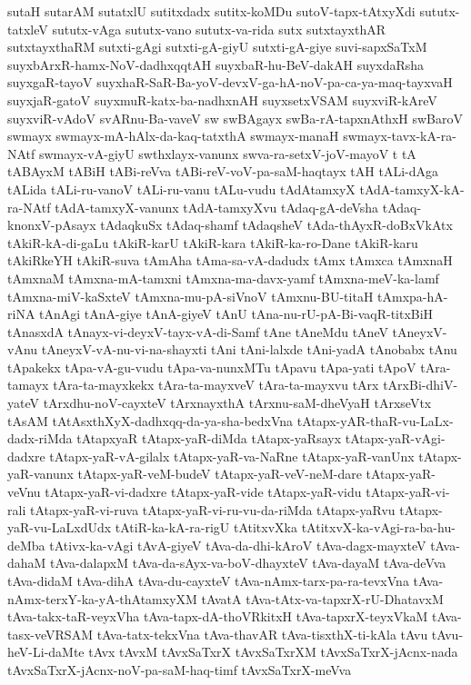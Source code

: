 {sutaH
sutarAM
sutatxlU
sutitxdadx
sutitx-koMDu
sutoV-tapx-tAtxyXdi
sututx-tatxleV
sututx-vAga
sututx-vano
sututx-va-rida
sutx
sutxtayxthAR
sutxtayxthaRM
sutxti-gAgi
sutxti-gA-giyU
sutxti-gA-giye
suvi-sapxSaTxM
suyxbArxR-hamx-NoV-dadhxqqtAH
suyxbaR-hu-BeV-dakAH
suyxdaRsha
suyxgaR-tayoV
suyxhaR-SaR-Ba-yoV-devxV-ga-hA-noV-pa-ca-ya-maq-tayxvaH
suyxjaR-gatoV
suyxmuR-katx-ba-nadhxnAH
suyxsetxVSAM
suyxviR-kAreV
suyxviR-vAdoV
svARnu-Ba-vaveV
sw
swBAgayx
swBa-rA-tapxnAthxH
swBaroV
swmayx
swmayx-mA-hAlx-da-kaq-tatxthA
swmayx-manaH
swmayx-tavx-kA-ra-NAtf
swmayx-vA-giyU
swthxlayx-vanunx
swva-ra-setxV-joV-mayoV
t
tA
tABAyxM
tABiH
tABi-reVva
tABi-reV-voV-pa-saM-haqtayx
tAH
tALi-dAga
tALida
tALi-ru-vanoV
tALi-ru-vanu
tALu-vudu
tAdAtamxyX
tAdA-tamxyX-kA-ra-NAtf
tAdA-tamxyX-vanunx
tAdA-tamxyXvu
tAdaq-gA-deVsha
tAdaq-knonxV-pAsayx
tAdaqkuSx
tAdaq-shamf
tAdaqsheV
tAda-thAyxR-doBxVkAtx
tAkiR-kA-di-gaLu
tAkiR-karU
tAkiR-kara
tAkiR-ka-ro-Dane
tAkiR-karu
tAkiRkeYH
tAkiR-suva
tAmAha
tAma-sa-vA-dadudx
tAmx
tAmxca
tAmxnaH
tAmxnaM
tAmxna-mA-tamxni
tAmxna-ma-davx-yamf
tAmxna-meV-ka-lamf
tAmxna-miV-kaSxteV
tAmxna-mu-pA-siVnoV
tAmxnu-BU-titaH
tAmxpa-hA-riNA
tAnAgi
tAnA-giye
tAnA-giyeV
tAnU
tAna-nu-rU-pA-Bi-vaqR-titxBiH
tAnasxdA
tAnayx-vi-deyxV-tayx-vA-di-Samf
tAne
tAneMdu
tAneV
tAneyxV-vAnu
tAneyxV-vA-nu-vi-na-shayxti
tAni
tAni-lalxde
tAni-yadA
tAnobabx
tAnu
tApakekx
tApa-vA-gu-vudu
tApa-va-nunxMTu
tApavu
tApa-yati
tApoV
tAra-tamayx
tAra-ta-mayxkekx
tAra-ta-mayxveV
tAra-ta-mayxvu
tArx
tArxBi-dhiV-yateV
tArxdhu-noV-cayxteV
tArxnayxthA
tArxnu-saM-dheVyaH
tArxseVtx
tAsAM
tAtAsxthXyX-dadhxqq-da-ya-sha-bedxVna
tAtapx-yAR-thaR-vu-LaLx-dadx-riMda
tAtapxyaR
tAtapx-yaR-diMda
tAtapx-yaRsayx
tAtapx-yaR-vAgi-dadxre
tAtapx-yaR-vA-gilalx
tAtapx-yaR-va-NaRne
tAtapx-yaR-vanUnx
tAtapx-yaR-vanunx
tAtapx-yaR-veM-budeV
tAtapx-yaR-veV-neM-dare
tAtapx-yaR-veVnu
tAtapx-yaR-vi-dadxre
tAtapx-yaR-vide
tAtapx-yaR-vidu
tAtapx-yaR-vi-rali
tAtapx-yaR-vi-ruva
tAtapx-yaR-vi-ru-vu-da-riMda
tAtapx-yaRvu
tAtapx-yaR-vu-LaLxdUdx
tAtiR-ka-kA-ra-rigU
tAtitxvXka
tAtitxvX-ka-vAgi-ra-ba-hu-deMba
tAtivx-ka-vAgi
tAvA-giyeV
tAva-da-dhi-kAroV
tAva-dagx-mayxteV
tAva-dahaM
tAva-dalapxM
tAva-da-sAyx-va-boV-dhayxteV
tAva-dayaM
tAva-deVva
tAva-didaM
tAva-dihA
tAva-du-cayxteV
tAva-nAmx-tarx-pa-ra-tevxVna
tAva-nAmx-terxY-ka-yA-thAtamxyXM
tAvatA
tAva-tAtx-va-tapxrX-rU-DhatavxM
tAva-takx-taR-veyxVha
tAva-tapx-dA-thoVRkitxH
tAva-tapxrX-teyxVkaM
tAva-tasx-veVRSAM
tAva-tatx-tekxVna
tAva-thavAR
tAva-tisxthX-ti-kAla
tAvu
tAvu-heV-Li-daMte
tAvx
tAvxM
tAvxSaTxrX
tAvxSaTxrXM
tAvxSaTxrX-jAcnx-nada
tAvxSaTxrX-jAcnx-noV-pa-saM-haq-timf
tAvxSaTxrX-meVva
}
